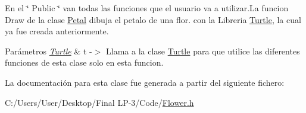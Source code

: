 En el \char`\"{} Public \char`\"{} van todas las funciones que el usuario va a utilizar.\+La funcion Draw de la clase \mbox{\hyperlink{class_petal}{Petal}} dibuja el petalo de una flor. con la Libreria \mbox{\hyperlink{class_turtle}{Turtle}}, la cual ya fue creada anteriormente.
\begin{DoxyParams}{Parámetros}
{\em \mbox{\hyperlink{class_turtle}{Turtle}}} & t -\/$>$ Llama a la clase \mbox{\hyperlink{class_turtle}{Turtle}} para que utilice las diferentes funciones de esta clase solo en esta funcion. \\
\hline
\end{DoxyParams}


La documentación para esta clase fue generada a partir del siguiente fichero\+:\begin{DoxyCompactItemize}
\item 
C\+:/\+Users/\+User/\+Desktop/\+Final L\+P-\/3/\+Code/\mbox{\hyperlink{_flower_8h}{Flower.\+h}}\end{DoxyCompactItemize}
